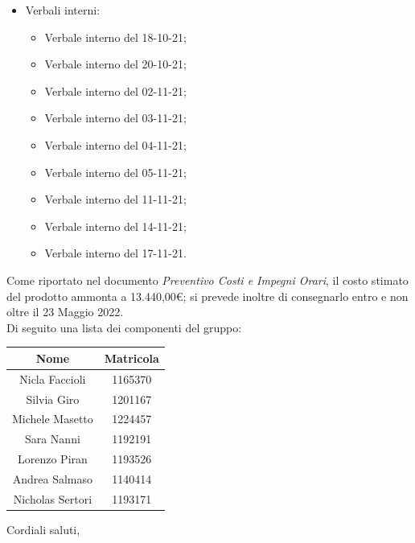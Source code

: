 \documentclass[11pt]{letter}
\begin{document}
\begin{letter}{}
\begin{itemize}
\begin{itemize}
			\end{itemize}
			\item Verbali interni:
			\begin{itemize}
				\item Verbale interno del 18-10-21;
				\item Verbale interno del 20-10-21;
				\item Verbale interno del 02-11-21;
				\item Verbale interno del 03-11-21;
				\item Verbale interno del 04-11-21;
				\item Verbale interno del 05-11-21;
				\item Verbale interno del 11-11-21;
				\item Verbale interno del 14-11-21;
				\item Verbale interno del 17-11-21.
			\end{itemize}
		\end{itemize}
		Come riportato nel documento \textit{Preventivo Costi e Impegni Orari}, il costo stimato del prodotto ammonta a 13.440,00\euro;
		si prevede inoltre di consegnarlo entro e non oltre il 23 Maggio 2022. \\
		Di seguito una lista dei componenti del gruppo: \\
		\begin{center}
			\begin{tabular}{ c | c }
				\textbf{Nome} & \textbf{Matricola} \\
				\hline Nicla Faccioli & 1165370 \\
				Silvia Giro & 1201167 \\
				Michele Masetto & 1224457 \\
				Sara Nanni & 1192191 \\
				Lorenzo Piran & 1193526 \\
				Andrea Salmaso & 1140414 \\
				Nicholas Sertori & 1193171 \\		
			\end{tabular}
		\end{center}
		\closing{Cordiali saluti,}
	\end{letter}
\end{document}
